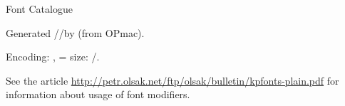 


\def\fontfamexecC#1#2#3#4#5#6#7{\ifx\relax#2\relax \else
   {\testfotenc{#6}\iftrue
       \par
       \noindent {\currtt [#1]\quad \char`\{+#5\char`\} \space(#6)\quad \def\tmp{#7} \detok\tmp}%
       \par\nobreak
       #7
       \edef\basicfont{\fontname\the\font}%
       \def\variants{#2}
       \pcatA {}#3\relax
       \medskip
    \else \par 
       \noindent {\currtt -- [#1] (#6) -- is unavailable in \fotenc\space encoding.}
       \medskip
    \fi}%
  \fi
}
\def\pcatA#1{\ifx#1\relax\par\else
   \def\prefix{#1}\expandafter\pcatB\variants\relax
   \expandafter\pcatA\fi
}
\def\pcatB#1{\ifx#1\relax\par\else
   {\ifx\ffnamegen\undefined \let\ffsetX=\relax \fi
   \ifx\prefix\empty\ffsetX#1\relax\else\prefix#1\relax\fi
   \ifx\ffvarV\undefined \def\ffvarV{x}\fi
   \ifx#1\tt \ifx\prefix\empty\else \def\ffvarV{!}\fi\fi
   \if!\ffvarV\relax \else
   \indent 
   {\currtt \ifx\prefix\empty \else \expandafter\string\prefix\fi \string#1 }%
   \advance\hsize by2in
   \fontfamsample\par
   \fi}%
   \expandafter\pcatB\fi
}

\nonum\sec Font Catalogue

\begingroup

\ifx\ffdecl\undefined  \fi

\parindent=0pt

Generated \the\day/\the\month/\the\year\space by 
{\tt \string\fontfam[Catalog]} (from OPmac).

Encoding: \fotenc, =\baselineskip
size: \expandafter\ignorept\the\fontdim /\expandafter\ignorept\the{}.

See the article \url{http://petr.olsak.net/ftp/olsak/bulletin/kpfonts-plain.pdf}
for information about usage of font modifiers.
\bigskip

